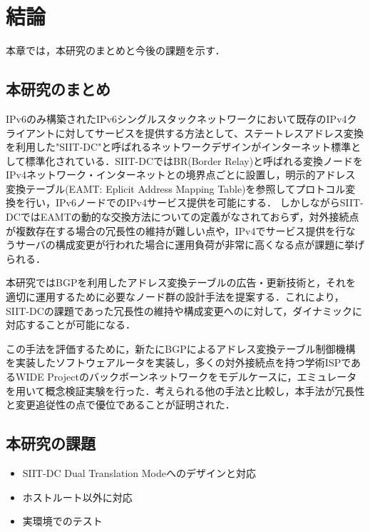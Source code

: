 \chapter{結論}
\label{conclusion}

本章では，本研究のまとめと今後の課題を示す．

\section{本研究のまとめ}
IPv6のみ構築されたIPv6シングルスタックネットワークにおいて既存のIPv4クライアントに対してサービスを提供する方法として、ステートレスアドレス変換を利用した"SIIT-DC"と呼ばれるネットワークデザインがインターネット標準として標準化されている．SIIT-DCではBR(Border Relay)と呼ばれる変換ノードをIPv4ネットワーク・インターネットとの境界点ごとに設置し，明示的アドレス変換テーブル(EAMT: Eplicit Address Mapping Table)を参照してプロトコル変換を行い，IPv6ノードでのIPv4サービス提供を可能にする．
しかしながらSIIT-DCではEAMTの動的な交換方法についての定義がなされておらず，対外接続点が複数存在する場合の冗長性の維持が難しい点や，IPv4でサービス提供を行なうサーバの構成変更が行われた場合に運用負荷が非常に高くなる点が課題に挙げられる．

本研究ではBGPを利用したアドレス変換テーブルの広告・更新技術と，それを適切に運用するために必要なノード群の設計手法を提案する．これにより，SIIT-DCの課題であった冗長性の維持や構成変更へのに対して，ダイナミックに対応することが可能になる．

この手法を評価するために，新たにBGPによるアドレス変換テーブル制御機構を実装したソフトウェアルータを実装し，多くの対外接続点を持つ学術ISPであるWIDE Projectのバックボーンネットワークをモデルケースに，エミュレータを用いて概念検証実験を行った．考えられる他の手法と比較し，本手法が冗長性と変更追従性の点で優位であることが証明された．

\section{本研究の課題}

\begin{itemize}
    \item SIIT-DC Dual Translation Modeへのデザインと対応\\
    \item ホストルート以外に対応
    \item 実環境でのテスト
    
\end{itemize}


